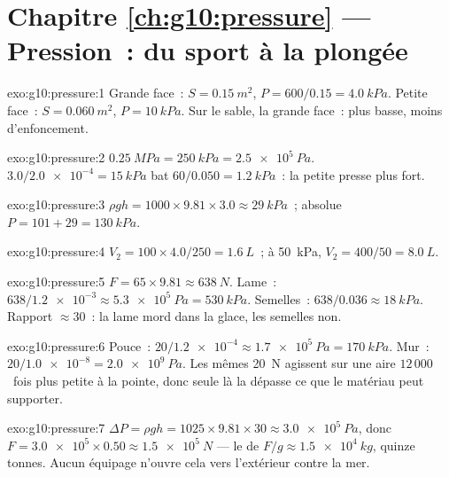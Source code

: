 \section*{Chapitre \ref{ch:g10:pressure} --- Pression~: du sport à la plongée}

\begin{solution}{exo:g10:pressure:1}
Grande face~: $S = \qty{0.15}{m^2}$, $P = 600/0.15 = \qty{4.0}{kPa}$.
Petite face~: $S = \qty{0.060}{m^2}$, $P = \qty{10}{kPa}$. Sur le
sable, la grande face~:  plus basse, moins d'enfoncement.
\end{solution}

\begin{solution}{exo:g10:pressure:2}
$\qty{0.25}{MPa} = \qty{250}{kPa} = \qty{2.5e5}{Pa}$.
$3.0/\num{2.0e-4} = \qty{15}{kPa}$ bat
$60/0.050 = \qty{1.2}{kPa}$~: la petite  presse plus fort.
\end{solution}

\begin{solution}{exo:g10:pressure:3}
$\rho g h = 1000 \times 9.81 \times 3.0 \approx \qty{29}{kPa}$~;
absolue $P = 101 + 29 = \qty{130}{kPa}$.
\end{solution}

\begin{solution}{exo:g10:pressure:4}
$V_2 = 100 \times 4.0 / 250 = \qty{1.6}{L}$~;
à \qty{50}{kPa}, $V_2 = 400/50 = \qty{8.0}{L}$.
\end{solution}

\begin{solution}{exo:g10:pressure:5}
$F = 65 \times 9.81 \approx \qty{638}{N}$. Lame~:
$638/\num{1.2e-3} \approx \qty{5.3e5}{Pa} = \qty{530}{kPa}$. Semelles~:
$638/0.036 \approx \qty{18}{kPa}$. Rapport $\approx 30$~: la lame
mord dans la glace, les semelles non.
\end{solution}

\begin{solution}{exo:g10:pressure:6}
Pouce~: $20/\num{1.2e-4} \approx \qty{1.7e5}{Pa} = \qty{170}{kPa}$.
Mur~: $20/\num{1.0e-8} = \qty{2.0e9}{Pa}$. Les mêmes \qty{20}{N}
agissent sur une aire $12\,000$~fois plus petite à la pointe, donc
seule là la  dépasse ce que le matériau peut
supporter.
\end{solution}

\begin{solution}{exo:g10:pressure:7}
$\Delta P = \rho g h = 1025 \times 9.81 \times 30 \approx
\qty{3.0e5}{Pa}$, donc
$F = \num{3.0e5} \times 0.50 \approx \qty{1.5e5}{N}$ --- le
 de $F/g \approx \qty{1.5e4}{kg}$, quinze tonnes.
Aucun équipage n'ouvre cela vers l'extérieur contre la mer.
\end{solution}

